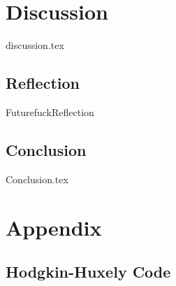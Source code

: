 \documentclass[printBibble]{myRUCProject}
\begin{document}
\newpage
\part{Discussion}
{discussion.tex}


\newpage
\chapter{Reflection} %
{FuturefuckReflection}

\newpage
\chapter{Conclusion}
{Conclusion.tex}



{
\glsaddall
\printglossary
}

\appendix
\part*{Appendix}

\chapter{Hodgkin-Huxely Code}


\end{document}
